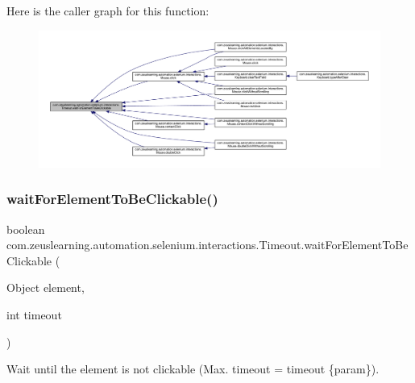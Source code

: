 Here is the caller graph for this function\+:
\nopagebreak
\begin{figure}[H]
\begin{center}
\leavevmode
\includegraphics[width=350pt]{d9/df4/classcom_1_1zeuslearning_1_1automation_1_1selenium_1_1interactions_1_1Timeout_a6c5ac29cf210e232ac851ebe52b9c226_icgraph}
\end{center}
\end{figure}
\hypertarget{classcom_1_1zeuslearning_1_1automation_1_1selenium_1_1interactions_1_1Timeout_a704a4c52aeb1fc87555e0f17b2a86cfe}{}\label{classcom_1_1zeuslearning_1_1automation_1_1selenium_1_1interactions_1_1Timeout_a704a4c52aeb1fc87555e0f17b2a86cfe} 
\subsubsection{\texorpdfstring{wait\+For\+Element\+To\+Be\+Clickable()}{waitForElementToBeClickable()}\hspace{0.1cm}{\footnotesize\ttfamily [2/2]}}
{\footnotesize\ttfamily boolean com.\+zeuslearning.\+automation.\+selenium.\+interactions.\+Timeout.\+wait\+For\+Element\+To\+Be\+Clickable (\begin{DoxyParamCaption}\item[{Object}]{element,  }\item[{int}]{timeout }\end{DoxyParamCaption})\hspace{0.3cm}{\ttfamily [inline]}}

Wait until the element is not clickable (Max. timeout = timeout \{param\}).


